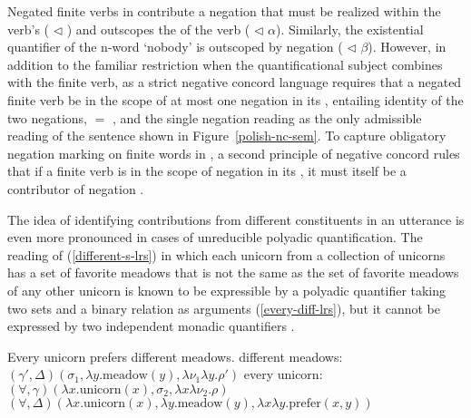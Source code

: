 \documentclass[output=paper
	        ,collection
	        ,collectionchapter
 	        ,biblatex
                ,babelshorthands
                ,newtxmath
                ,draftmode
                ,colorlinks, citecolor=brown
]{langscibook}
\begin{document}
Negated finite verbs in  contribute a negation that must be realized
within the verb's  ( $\triangleleft$ ) and
outscopes the  of the verb ( $\triangleleft$ $\alpha$).
Similarly, the existential quantifier of the n-word  `nobody' is
outscoped by negation ( $\triangleleft$ $\beta$). However, in addition
to the familiar restriction when the quantificational subject combines
with the finite verb,  as a strict negative concord language requires
that a negated finite verb be in the scope of at most one negation in
its , entailing identity of the two negations,
 $=$ , and the single negation reading  as
the only admissible reading of the sentence shown in Figure~\ref{polish-nc-sem}.
To capture obligatory negation marking on finite words in , a second
principle of negative concord rules that if a finite verb is in the scope
of negation in its , it must itself be a contributor of negation \citep[316]{RichterandSailer2001}.

The idea of identifying contributions from different constituents in
an utterance is even more pronounced in cases of unreducible polyadic
quantification. The reading of (\ref{different-s-lrs}) in which each
unicorn from a collection of unicorns has a set of favorite meadows that
is not the same as the set of favorite meadows of any other unicorn is known
to be expressible by a polyadic quantifier taking two sets and a binary
relation as arguments (\ref{every-diff-lrs}), but it cannot be expressed by
two independent monadic quantifiers \citep{Keenan1992b}.


\begin{exe}
\ex\label{different-lrs}
\begin{xlist}
\ex\label{different-s-lrs} Every unicorn prefers different meadows.
\ex \label{different-meadows-lrs}
different meadows: \hspace{0.18cm} $(\gamma', \Delta)(\sigma_1, \lambda y.\text{meadow}(y), \lambda \nu_1\lambda y.\rho')$
\ex \label{every-unicorn-lrs}
every unicorn: \hspace{0.95cm}$(\forall, \gamma)(\lambda x.\text{unicorn}(x), \sigma_2, \lambda x\lambda \nu_2.\rho)$
\ex \label{every-diff-lrs}
$(\forall, \Delta)(\lambda x.\text{unicorn}(x), \lambda y.\text{meadow}(y), \lambda x\lambda y.\text{prefer}(x,y))$
\end{xlist}
\end{exe}
\end{document}
